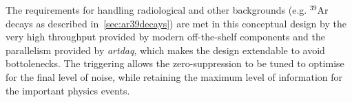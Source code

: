 

The requirements for handling radiological and other backgrounds (e.g. $^{39}$Ar decays as described
in~\ref{sec:ar39decays}) are met in this conceptual design by the very high throughput provided by modern
off-the-shelf components  and the parallelism provided by \textit{artdaq}, which makes the design extendable to avoid bottolenecks.  The triggering
allows the zero-suppression to be tuned to optimise for the final
level of noise, while retaining the maximum level of information for
the important physics events.



